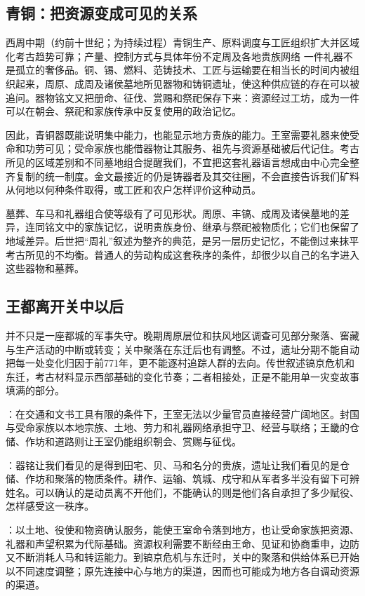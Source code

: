 \subsection{青铜：把资源变成可见的关系}

\begin{event}{西周中期（约前十世纪；为持续过程）}{青铜生产、原料调度与工匠组织扩大并区域化}{考古趋势可靠；产量、控制方式与具体年份不定}{周及各地贵族网络}
一件礼器不是孤立的奢侈品。铜、锡、燃料、范铸技术、工匠与运输要在相当长的时间内被组织起来，周原、成周及诸侯墓地所见器物和铸铜遗址，使这种供应链的存在可以被追问。器物铭文又把册命、征伐、赏赐和祭祀保存下来：资源经过工坊，成为一件可以在朝会、祭祀和家族传承中反复使用的政治记忆。

因此，青铜器既能说明集中能力，也能显示地方贵族的能力。王室需要礼器来使受命和功劳可见；受命家族也能借器物让其服务、祖先与资源基础被后代记住。考古所见的区域差别和不同墓地组合提醒我们，不宜把这套礼器语言想成由中心完全整齐复制的统一制度。金文最接近的仍是铸器者及其交往圈，不会直接告诉我们矿料从何地以何种条件取得，或工匠和农户怎样评价这种动员。
\end{event}

墓葬、车马和礼器组合使等级有了可见形状。周原、丰镐、成周及诸侯墓地的差异，连同铭文中的家族记忆，说明贵族身份、继承与祭祀被物质化；它们也保留了地域差异。后世把“周礼”叙述为整齐的典范，是另一层历史记忆，不能倒过来抹平考古所见的不均衡。普通人的劳动构成这套秩序的条件，却很少以自己的名字进入这些器物和墓葬。

\subsection{王都离开关中以后}

并不只是一座都城的军事失守。晚期周原层位和扶风地区调查可见部分聚落、窖藏与生产活动的中断或转变；关中聚落在东迁后也有调整。不过，遗址分期不能自动把每一处变化归因于前771年，更不能逐村追踪人群的去向。传世叙述镐京危机和东迁，考古材料显示西部基础的变化节奏；二者相接处，正是不能用单一灾变故事填满的部分。

\begin{turningpoint}
：在交通和文书工具有限的条件下，王室无法以少量官员直接经营广阔地区。封国与受命家族以本地宗族、土地、劳力和礼器网络承担守卫、经营与联络；王畿的仓储、作坊和道路则让王室仍能组织朝会、赏赐与征伐。

：器铭让我们看见的是得到田宅、贝、马和名分的贵族，遗址让我们看见的是仓储、作坊和聚落的物质条件。耕作、运输、筑城、戍守和从军者多半没有留下可辨姓名。可以确认的是动员离不开他们，不能确认的则是他们各自承担了多少赋役、怎样感受这一秩序。

：以土地、役使和物资确认服务，能使王室命令落到地方，也让受命家族把资源、礼器和声望积累为代际基础。资源权利需要不断经由王命、见证和协商重申，边防又不断消耗人马和转运能力。到镐京危机与东迁时，关中的聚落和供给体系已开始以不同速度调整；原先连接中心与地方的渠道，因而也可能成为地方各自调动资源的渠道。
\end{turningpoint}

